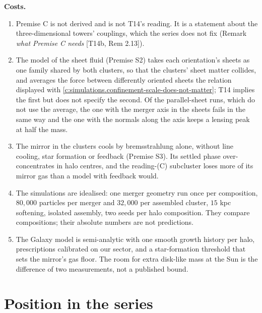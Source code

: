 \documentclass[11pt]{article}
\theoremstyle{definition}
\theoremstyle{plain}
\begin{document}
\label{c:note.simulations.setting-what-tests-decide-what-they-4}
\textbf{Costs.}
\begin{enumerate}
\item[(K1)] Premise C is not derived and is not T14's reading. It is a statement about the three-dimensional towers' couplings, which the series does not fix (Remark \emph{what Premise C needs} [T14b, Rem 2.13]).
\item[(K2)] The model of the sheet fluid (Premise S2) takes each orientation's sheets as one family shared by both clusters, so that the clusters' sheet matter collides, and averages the force between differently oriented sheets the relation displayed with \ref{c:simulations.confinement-scale-does-not-matter}; T14 implies the first \cite[Lem.~6.1, Prem.~7.4]{ButlerT14} but does not specify the second. Of the parallel-sheet runs, which do not use the average, the one with the merger axis in the sheets fails in the same way and the one with the normals along the axis keeps a lensing peak at half the mass.
\item[(K3)] The mirror in the clusters cools by bremsstrahlung alone, without line cooling, star formation or feedback (Premise S3). Its settled phase over-concentrates in halo centres, and the reading-(C) subcluster loses more of its mirror gas than a model with feedback would.
\item[(K4)] The simulations are idealised: one merger geometry run once per composition, $80{,}000$ particles per merger and $32{,}000$ per assembled cluster, $15$ kpc softening, isolated assembly, two seeds per halo composition. They compare compositions; their absolute numbers are not predictions.
\item[(K5)] The Galaxy model is semi-analytic with one smooth growth history per halo, prescriptions calibrated on our sector, and a star-formation threshold that sets the mirror's gas floor. The room for extra disk-like mass at the Sun is the difference of two measurements, not a published bound.
\end{enumerate}

\section{Position in the series}
\end{document}
